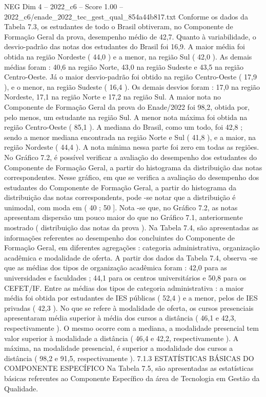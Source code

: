 \begin{textsample}{NEG Dim 4 – 2022\_c6 – Score 1.00 – 2022\_c6/enade\_2022\_tec\_gest\_qual\_854a44b817.txt}
Conforme os dados da Tabela 7.3, os estudantes de todo o Brasil obtiveram, no Componente de Formação Geral da prova, desempenho médio de 42,7.
Quanto à variabilidade, o desvio-padrão das notas dos estudantes do Brasil foi 16,9.
A maior média foi obtida na região Nordeste ( 44,0 ) e a menor, na região Sul ( 42,0 ).
As demais médias foram : 40,6 na região Norte, 43,0 na região Sudeste e 43,5 na região Centro-Oeste.
Já o maior desvio-padrão foi obtido na região Centro-Oeste ( 17,9 ), e o menor, na região Sudeste ( 16,4 ).
Os demais desvios foram : 17,0 na região Nordeste, 17,1 na região Norte e 17,2 na região Sul.
A maior nota no Componente de Formação Geral da prova do Enade/2022 foi 98,2, obtida por, pelo menos, um estudante na região Sul.
A menor nota máxima foi obtida na região Centro-Oeste ( 85,1 ).
A mediana do Brasil, como um todo, foi 42,8 ; sendo a menor mediana encontrada na região Norte e Sul ( 41,8 ), e a maior, na região Nordeste ( 44,4 ).
A nota mínima nessa parte foi zero em todas as regiões.
No Gráfico 7.2, é possível verificar a avaliação do desempenho dos estudantes do Componente de Formação Geral, a partir do histograma da distribuição das notas correspondentes.
Nesse gráfico, em que se verifica a avaliação do desempenho dos estudantes do Componente de Formação Geral, a partir do histograma da distribuição das notas correspondents, pode -se notar que a distribuição é unimodal, com moda em ( 40 ; 50 ].
Nota -se que, no Gráfico 7.2, as notas apresentam dispersão um pouco maior do que no Gráfico 7.1, anteriormente mostrado ( distribuição das notas da prova ).
Na Tabela 7.4, são apresentadas as informações referentes ao desempenho dos concluintes do Componente de Formação Geral, em diferentes agregações : categoria administrativa, organização acadêmica e modalidade de oferta.
A partir dos dados da Tabela 7.4, observa -se que as médias dos tipos de organização acadêmica foram : 42,0 para as universidades e faculdades ; 44,1 para os centros universitários e 50,8 para os CEFET/IF.
Entre as médias dos tipos de categoria administrativa : a maior média foi obtida por estudantes de IES públicas ( 52,4 ) e a menor, pelos de IES privadas ( 42,3 ).
No que se refere à modalidade de oferta, os cursos presenciais apresentaram média superior à média dos cursos a distância ( 46,1 e 42,3, respectivamente ).
O mesmo ocorre com a mediana, a modalidade presencial tem valor superior à modalidade a distância ( 46,4 e 42,2, respectivamente ).
A máxima, na modalidade presencial, é superior a modalidade dos cursos a distância ( 98,2 e 91,5, respectivamente ). 7.1.3 ESTATÍSTICAS BÁSICAS DO COMPONENTE ESPECÍFICO Na Tabela 7.5, são apresentadas as estatísticas básicas referentes ao Componente Específico da área de Tecnologia em Gestão da Qualidade.

\end{textsample}
